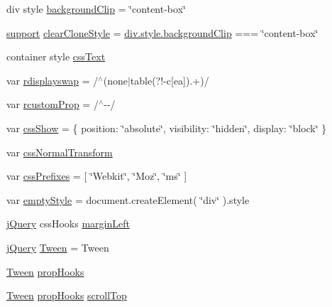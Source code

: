 \begin{DoxyCompactItemize}
\item 
div style \hyperlink{jquery-3_82_81_8js_adbba85353f0cf06c0afdc8063e67fbd8}{background\+Clip} = \char`\"{}content-\/box\char`\"{}
\item 
\hyperlink{jquery-3_82_81_8js_ab166c89ccabddfd7c423a7fcb23ca84f}{support} \hyperlink{jquery-3_82_81_8js_a84a1e96cbde9b0fb098c4b12b0b559d6}{clear\+Clone\+Style} = \hyperlink{jquery-3_82_81_8js_adbba85353f0cf06c0afdc8063e67fbd8}{div.\+style.\+background\+Clip} === \char`\"{}content-\/box\char`\"{}
\item 
container style \hyperlink{jquery-3_82_81_8js_a4629b18ca428e3849d3fdc36db6eb33b}{css\+Text}
\item 
var \hyperlink{jquery-3_82_81_8js_a4ec3cae64deadc15dedfb1eb7d2edfd6}{rdisplayswap} = /$^\wedge$(none$\vert$table(?!-\/c\mbox{[}ea\mbox{]}).+)/
\item 
var \hyperlink{jquery-3_82_81_8js_a6b1af39dd6de739187a2acc21ea28d9b}{rcustom\+Prop} = /$^\wedge$-\/-\//
\item 
var \hyperlink{jquery-3_82_81_8js_a2b4645641dc8710f01a9fc6cb72dfb2a}{css\+Show} = \{ position\+: \char`\"{}absolute\char`\"{}, visibility\+: \char`\"{}hidden\char`\"{}, display\+: \char`\"{}block\char`\"{} \}
\item 
var \hyperlink{jquery-3_82_81_8js_a6674465ca49f03858aec8237d92ad001}{css\+Normal\+Transform}
\item 
var \hyperlink{jquery-3_82_81_8js_aa1d774f23376bc71c9644072114c9c8c}{css\+Prefixes} = \mbox{[} \char`\"{}Webkit\char`\"{}, \char`\"{}Moz\char`\"{}, \char`\"{}ms\char`\"{} \mbox{]}
\item 
var \hyperlink{jquery-3_82_81_8js_a9026d1a3ba8848668d3ef83ef6142c81}{empty\+Style} = document.\+create\+Element( \char`\"{}div\char`\"{} ).style
\item 
\hyperlink{jquery-3_82_81_8js_a609525712f1102566c2b03866ceb2bba}{j\+Query} css\+Hooks \hyperlink{jquery-3_82_81_8js_a1ef83a037ddb0cdf2dbc8d1e9d6e830e}{margin\+Left}
\item 
\hyperlink{jquery-3_82_81_8js_a609525712f1102566c2b03866ceb2bba}{j\+Query} \hyperlink{jquery-3_82_81_8js_a91e55267cc469e865a6a7c6cfc51c7b1}{Tween} = Tween
\item 
\hyperlink{jquery-3_82_81_8js_adcb517ce3709049d37bb5f5bd3811edf}{Tween} \hyperlink{jquery-3_82_81_8js_a5679fa4cd6152d76b96e19f7dfb8b057}{prop\+Hooks}
\item 
\hyperlink{jquery-3_82_81_8js_adcb517ce3709049d37bb5f5bd3811edf}{Tween} \hyperlink{jquery-3_82_81_8js_a5679fa4cd6152d76b96e19f7dfb8b057}{prop\+Hooks} \hyperlink{jquery-3_82_81_8js_a57beb1f611d6c8b84919b0f7d9e0e890}{scroll\+Top}

\end{DoxyCompactItemize}
